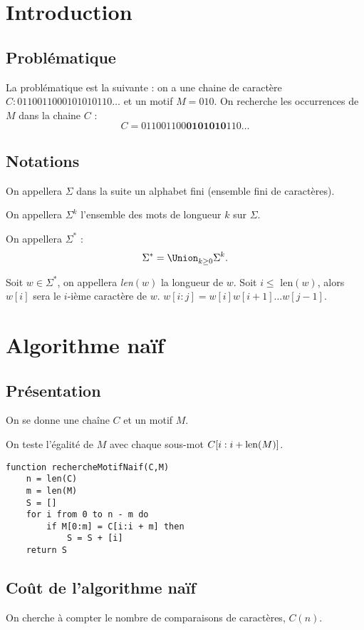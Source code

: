 \documentclass{mybourbaki}
\begin{document}
\section*{Introduction}
\subsection*{Problématique}
La problématique est la suivante : on a une chaine de caractère $C : 0110011000101010110\ldots$ et un motif $M = 010$. On recherche les occurrences de $M$ dans la chaine $C$ :
\[ C = 011001100\boldsymbol{010}\boldsymbol{10}\boldsymbol{10}110\ldots \]

\subsection*{Notations}
On appellera $\Sigma$ dans la suite un alphabet fini (ensemble fini de caractères).

On appellera $\Sigma^{k}$ l'ensemble des mots de longueur $k$ sur $\Sigma$.

On appellera $\Sigma^{*}$ : \[ \Sigma^{*} = \Union_{k \geq 0}^{}\Sigma^{k}.\]

Soit $w\in \Sigma^{*}$, on appellera \textit{len$(w)$} la longueur de $w$. Soit $i\leq$ len$(w)$, alors $w[i]$ sera le $i$-ième caractère de $w$. $w[i:j] = w[i]w[i+1]\ldots w[j-1]$.

\section{Algorithme naïf}
\subsection{Présentation}
On se donne une chaîne $C$ et un motif $M$.

On teste l'égalité de $M$ avec chaque sous-mot $C[i:i+{\rm len}(M)]$.


\begin{lstlisting}
function rechercheMotifNaif(C,M)
	n = len(C)
	m = len(M)
	S = []
	for i from 0 to n - m do
		if M[0:m] = C[i:i + m] then
			S = S + [i]
	return S		
\end{lstlisting}

\subsection{Coût de l'algorithme naïf}
On cherche à compter le nombre de comparaisons de caractères, $C(n)$.
\end{document}
